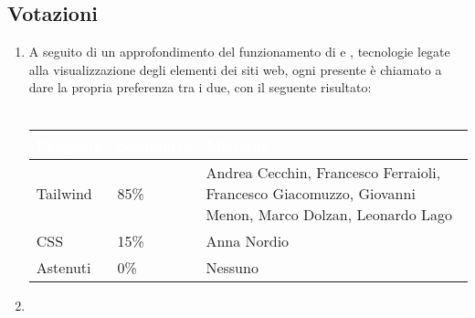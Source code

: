 \subsection{Votazioni} \label{subsec:resvotazione}
\begin{enumerate}
    \item A seguito di un approfondimento del funzionamento di  e , tecnologie legate alla visualizzazione degli elementi dei siti web, ogni presente è chiamato a dare la propria preferenza tra i due, con il seguente risultato:
 \\\\
        \begingroup
            \setlength{\tabcolsep}{10pt}
            \renewcommand{\arraystretch}{1.5}
            \begin{tabularx}{0.93\textwidth}{| l | l | X |}
                 \hline
                 \rowcolor{headerrow}\textbf{\textcolor{white}{Proposta}} & \textbf{\textcolor{white}{Sommario}} & \textbf{\textcolor{white}{Mittente}} \\
                 \hline
                 Tailwind & 85\%  & Andrea Cecchin, Francesco Ferraioli, Francesco Giacomuzzo, Giovanni Menon, Marco Dolzan, Leonardo Lago \\
                 \hline
                 CSS & 15\% &  Anna Nordio\\
                 \hline
                 Astenuti & 0\% & Nessuno \\
                 \hline
            \end{tabularx}
        \endgroup
    \item
\end{enumerate}

